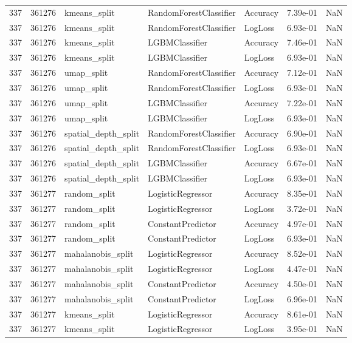 \begin{tabular}{rrlllrr}
337 & 361276 & kmeans\_split & RandomForestClassifier & Accuracy & 7.39e-01 & NaN \\
337 & 361276 & kmeans\_split & RandomForestClassifier & LogLoss & 6.93e-01 & NaN \\
337 & 361276 & kmeans\_split & LGBMClassifier & Accuracy & 7.46e-01 & NaN \\
337 & 361276 & kmeans\_split & LGBMClassifier & LogLoss & 6.93e-01 & NaN \\
337 & 361276 & umap\_split & RandomForestClassifier & Accuracy & 7.12e-01 & NaN \\
337 & 361276 & umap\_split & RandomForestClassifier & LogLoss & 6.93e-01 & NaN \\
337 & 361276 & umap\_split & LGBMClassifier & Accuracy & 7.22e-01 & NaN \\
337 & 361276 & umap\_split & LGBMClassifier & LogLoss & 6.93e-01 & NaN \\
337 & 361276 & spatial\_depth\_split & RandomForestClassifier & Accuracy & 6.90e-01 & NaN \\
337 & 361276 & spatial\_depth\_split & RandomForestClassifier & LogLoss & 6.93e-01 & NaN \\
337 & 361276 & spatial\_depth\_split & LGBMClassifier & Accuracy & 6.67e-01 & NaN \\
337 & 361276 & spatial\_depth\_split & LGBMClassifier & LogLoss & 6.93e-01 & NaN \\
337 & 361277 & random\_split & LogisticRegressor & Accuracy & 8.35e-01 & NaN \\
337 & 361277 & random\_split & LogisticRegressor & LogLoss & 3.72e-01 & NaN \\
337 & 361277 & random\_split & ConstantPredictor & Accuracy & 4.97e-01 & NaN \\
337 & 361277 & random\_split & ConstantPredictor & LogLoss & 6.93e-01 & NaN \\
337 & 361277 & mahalanobis\_split & LogisticRegressor & Accuracy & 8.52e-01 & NaN \\
337 & 361277 & mahalanobis\_split & LogisticRegressor & LogLoss & 4.47e-01 & NaN \\
337 & 361277 & mahalanobis\_split & ConstantPredictor & Accuracy & 4.50e-01 & NaN \\
337 & 361277 & mahalanobis\_split & ConstantPredictor & LogLoss & 6.96e-01 & NaN \\
337 & 361277 & kmeans\_split & LogisticRegressor & Accuracy & 8.61e-01 & NaN \\
337 & 361277 & kmeans\_split & LogisticRegressor & LogLoss & 3.95e-01 & NaN \\

\end{tabular}
